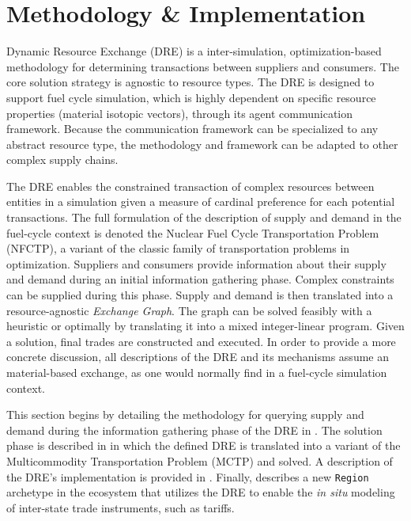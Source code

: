 



\section{Methodology \& Implementation}\label{sec:methods}

Dynamic Resource Exchange (DRE) is a inter-simulation, optimization-based
methodology for determining transactions between suppliers and consumers. The
core solution strategy is agnostic to resource types. The DRE is designed to
support fuel cycle simulation, which is highly dependent on specific resource
properties (material isotopic vectors), through its agent communication
framework. Because the communication framework can be specialized to any
abstract resource type, the methodology and framework can be adapted to other
complex supply chains.

The DRE enables the constrained transaction of complex resources between
entities in a simulation given a measure of cardinal preference for each
potential transactions. The full formulation of the description of supply and
demand in the fuel-cycle context is denoted the Nuclear Fuel Cycle
Transportation Problem (NFCTP), a variant of the classic family of
transportation problems in optimization. Suppliers and consumers provide
information about their supply and demand during an initial information
gathering phase. Complex constraints can be supplied during this phase. Supply
and demand is then translated into a resource-agnostic \textit{Exchange
  Graph}. The graph can be solved feasibly with a heuristic or optimally by
translating it into a mixed integer-linear program. Given a solution, final
trades are constructed and executed. In order to provide a more concrete
discussion, all descriptions of the DRE and its mechanisms assume an
material-based exchange, as one would normally find in a fuel-cycle simulation
context.

This section begins by detailing the methodology for querying supply and demand
during the information gathering phase of the DRE in . The
solution phase is described in  in which the defined DRE is
translated into a variant of the Multicommodity Transportation Problem (MCTP)
and solved. A description of the DRE's implementation is provided in
. Finally,  describes a new
\texttt{Region} archetype in the \Cyclus ecosystem that utilizes the DRE to
enable the \textit{in situ} modeling of inter-state trade instruments, such as
tariffs.


